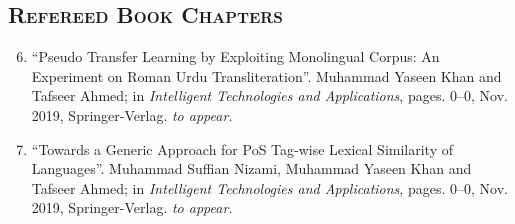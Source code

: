 \documentclass[a4paper, 10pt]{article}
\begin{document}
\subsection*{\normalfont\textsc{\bf Refereed Book Chapters}}
\begin{enumerate}
\setcounter{enumi}{5}
\itemsep-4pt 
 \item ``Pseudo Transfer Learning by Exploiting Monolingual Corpus: An Experiment on Roman Urdu Transliteration''. Muhammad Yaseen Khan and Tafseer Ahmed; in \emph{Intelligent Technologies and Applications}, pages. 0--0, Nov. 2019, Springer-Verlag. \emph{\small to appear.}
  
   \item ``Towards a Generic Approach for PoS Tag-wise Lexical Similarity of Languages''. Muhammad Suffian Nizami, Muhammad Yaseen Khan and Tafseer Ahmed; in \emph{Intelligent Technologies and Applications}, pages. 0--0, Nov. 2019, Springer-Verlag. \emph{\small to appear.}
 \end{enumerate}
\end{document}
